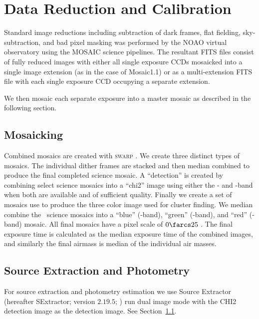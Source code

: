 \documentclass[apj, revtex4-1]{emulateapj}
\begin{document}
\section{Data Reduction and Calibration}\label{sec:data reduction}
Standard image reductions including subtraction of dark frames, flat fielding, sky-subtraction, and bad pixel masking was performed by the NOAO virtual observatory using the MOSAIC \citep{Valdes2007} science pipelines. The resultant FITS files consist of fully reduced images with either all single exposure CCDs mosaicked into a single image extension (as in the case of Mosaic1.1) or as a multi-extension FITS file with each single exposure CCD occupying a separate extension.

We then mosaic each separate exposure into a master mosaic as described in the following section.

\subsection{Mosaicking}\label{sec:mosaicks}
Combined mosaics are created with \textsc{swarp} \citep{Bertin2002}. We create three distinct types of mosaics. The individual dither frames are stacked and then median combined to produce the final completed science mosaic. A ``detection'' is created by combining select science mosaics into a ``chi2'' image using either the \sdssi- and \sdssz-band when both are available and of sufficient quality. Finally we create a set of mosaics use to produce the three color image used for cluster finding. We median combine the \sdssg\sdssr\sdssi\sdssz\ science mosaics into a ``blue'' (\sdssg-band), ``green'' (\sdssr-band), and ``red'' (\sdssi\sdssz-band) mosaic. All final mosaics have a pixel scale of $0\farcs25$ \perpixel. The final exposure time is calculated as the median exposure time of the combined images, and similarly the final airmass is median of the individual air masses.


\subsection{Source Extraction and Photometry}\label{sec:sextractor}
For source extraction and photometry estimation we use Source Extractor (hereafter SExtractor; version $2.19.5$; \citealt{Bertin1996}) run dual image mode with the CHI2 detection image as the detection image. See Section~\ref{sec:mosaicks}.
\end{document}
